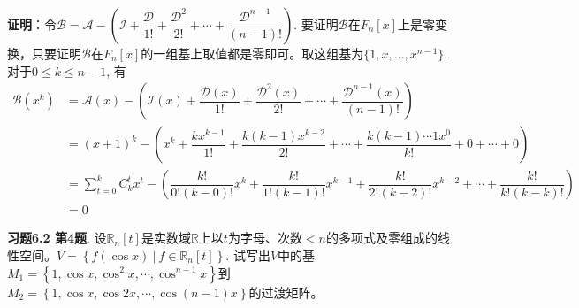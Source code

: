
{\bf 证明}：令$\mathscr{B} = \mathscr{A} - \left( \mathscr{I} + \dfrac{\mathscr{D}}{1!} + \dfrac{\mathscr{D}^2}{2!} + \cdots + \dfrac{\mathscr{D}^{n-1}}{(n-1)!} \right)$. 要证明$\mathscr{B}$在$F_n[x]$上是零变换，只要证明$\mathscr{B}$在$F_n[x]$的一组基上取值都是零即可。取这组基为$\{ 1, x, \ldots, x^{n-1} \}$. 对于$0 \leqslant k \leqslant n-1$, 有
\begin{align*}
\mathscr{B}(x^k) & = \mathscr{A}(x) - \left( \mathscr{I}(x) + \dfrac{\mathscr{D}(x)}{1!} + \dfrac{\mathscr{D}^2(x)}{2!} + \cdots + \dfrac{\mathscr{D}^{n-1}(x)}{(n-1)!} \right) \\
& = (x+1)^k - \left( x^k + \dfrac{kx^{k-1}}{1!} + \dfrac{k(k-1)x^{k-2}}{2!} + \cdots + \dfrac{k(k-1)\cdots 1 x^0}{k!} + 0 + \cdots + 0 \right) \\
& = \sum_{t=0}^{k} C_k^tx^t - \left( \dfrac{k!}{0!(k-0)!}x^k + \dfrac{k!}{1!(k-1)!}x^{k-1} + \dfrac{k!}{2!(k-2)!}x^{k-2} + \cdots + \dfrac{k!}{k!(k-k)!} \right) \\
& = 0
\end{align*}


\newpageorvspace


{\bf 习题6.2 第4题}. 设$\mathbb{R}_n[t]$是实数域$\mathbb{R}$上以$t$为字母、次数$<n$的多项式及零组成的线性空间。$V=\left\{ f(\cos x) \ |\ f \in \mathbb{R}_n[t] \right\}$. 试写出$V$中的基$M_1 = \left\{ 1, \cos x, \cos^2 x, \cdots, \cos^{n-1} x \right\}$到$M_2 = \left\{ 1, \cos x, \cos 2x, \cdots, \cos (n-1)x \right\}$的过渡矩阵。

